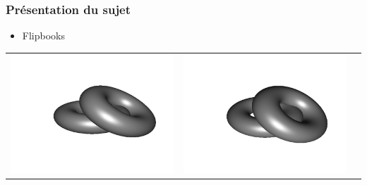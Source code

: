 \documentclass{beamer}
\begin{document}



\begin{frame}
\frametitle{Présentation du sujet}
\begin{itemize}[label=$\bullet$]
\item Flipbooks
\end{itemize}
\begin{tabular}{l|c|r}
\includegraphics[scale=0.15]{flip1.png}
&
\includegraphics[scale=0.15]{flip2.png}
&

\end{tabular}
\end{frame}
\end{document}
